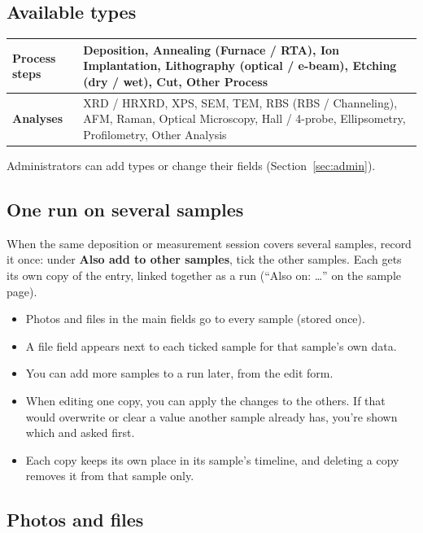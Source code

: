 \documentclass[11pt,a4paper]{article}
\newcommand{\ui}[1]{\textsf{\textbf{#1}}}
\begin{document}
\subsection{Available types}

\begin{center}
\begin{tabularx}{\linewidth}{@{}lX@{}}
\toprule
\textbf{Process steps} & Deposition, Annealing (Furnace / RTA), Ion
  Implantation, Lithography (optical / e-beam), Etching (dry / wet), Cut,
  Other Process \\
\midrule
\textbf{Analyses} & XRD / HRXRD, XPS, SEM, TEM, RBS (RBS / Channeling),
  AFM, Raman, Optical Microscopy, Hall / 4-probe, Ellipsometry,
  Profilometry, Other Analysis \\
\bottomrule
\end{tabularx}
\end{center}

Administrators can add types or change their fields
(Section~\ref{sec:admin}).

\subsection{One run on several samples}
\label{sec:runs}

When the same deposition or measurement session covers several samples,
record it once: under \ui{Also add to other samples}, tick the other
samples. Each gets its own copy of the entry, linked together as a run
(``Also on: \ldots'' on the sample page).

\begin{itemize}
  \item Photos and files in the main fields go to every sample (stored once).
  \item A file field appears next to each ticked sample for that sample's
        own data.
  \item You can add more samples to a run later, from the edit form.
  \item When editing one copy, you can apply the changes to the others.
        If that would overwrite or clear a value another sample already
        has, you're shown which and asked first.
  \item Each copy keeps its own place in its sample's timeline, and
        deleting a copy removes it from that sample only.
\end{itemize}

\subsection{Photos and files}
\end{document}

